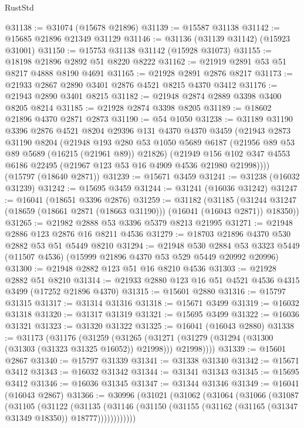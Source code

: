 \begin{lexlean}{RustStd}
\begin{coremodule}
@31138 := @31074 (@15678 @21896)
@31139 := @15587 @31138
@31142 := @15685 @21896 @21349 @31129
@31146 := @31136 (@31139 @31142) (@15923 @31001)
@31150 := @15753 @31138 @31142 (@15928 @31073)
@31155 := @18198 @21896 @2892 @51 @8220 @8222
@31162 := @21919 @2891 @53 @51 @8217 @4888 @8190 @4691
@31165 := @21928 @2891 @2876 @8217
@31173 := @21933 @2867 @2890 @3401 @2876 @4521 @8215 @4370 @3412
@31176 := @21943 @2890 @3401 @8215
@31182 := @21948 @2874 @2889 @3398 @3400 @8205 @8214
@31185 := @21928 @2874 @3398 @8205
@31189 := @18602 @21896 @4370 @2871 @2873
@31190 := @54 @1050
@31238 := @31189
    @31190
    @3396
    @2876
    @4521
    @8204
    @29396
    @131
    @4370
    @4370
    @3459
    (@21943
      @2873
      @31190
      @8204
      (@21948
        @193
        @280
        @53
        @1050
        @5689
        @6187
        (@21956 @89 @53 @89 @5689 (@16215 (@21961 @89)) @21826)
        (@21949 @156 @102 @347 @4553 @6186 @22495 (@21967 @123 @53 @16 @4909 @4536 @21980 @21998))))
    (@15797 (@18640 @2871))
@31239 := @15671 @3459
@31241 := @31238 (@16032 @31239)
@31242 := @15695 @3459
@31244 := @31241 (@16036 @31242)
@31247 := @16041 (@18651 @3396 @2876)
@31259 := @31182
    (@31185 (@31244 @31247 (@18659 (@18661 @2871 (@18663 @31190))) (@16041 (@16043 @2871)) @18350))
@31265 := @21982 @2888 @53 @3396 @5379 @8213 @21995
@31271 := @21948 @2886 @123 @2876 @16 @8211 @4536
@31279 := @18703 @21896 @4370 @530 @2882 @53 @51 @5449 @8210
@31294 := @21948
    @530
    @2884
    @53
    @3323
    @5449
    (@11507 @4536)
    (@15999 @21896 @4370 @53 @529 @5449 @20992 @20996)
@31300 := @21948 @2882 @123 @51 @16 @8210 @4536
@31303 := @21928 @2882 @51 @8210
@31314 := @21933 @2880 @123 @16 @51 @4521 @4536 @4315 @3499 (@17252 @21896 @4370)
@31315 := @15601 @2880
@31316 := @15797 @31315
@31317 := @31314 @31316
@31318 := @15671 @3499
@31319 := @16032 @31318
@31320 := @31317 @31319
@31321 := @15695 @3499
@31322 := @16036 @31321
@31323 := @31320 @31322
@31325 := @16041 (@16043 @2880)
@31338 := @31173
    (@31176
      (@31259
        (@31265 (@31271 (@31279 (@31294 (@31300 (@31303 (@31323 @31325 @16052)) @21998))) @21998))))
@31339 := @15601 @2867
@31340 := @15797 @31339
@31341 := @31338 @31340
@31342 := @15671 @3412
@31343 := @16032 @31342
@31344 := @31341 @31343
@31345 := @15695 @3412
@31346 := @16036 @31345
@31347 := @31344 @31346
@31349 := @16041 (@16043 @2867)
@31366 := @30996
    (@31021
      (@31062
        (@31064
          (@31066
            (@31087
              (@31105
                (@31122
                  (@31135
                    (@31146
                      (@31150 (@31155 (@31162 (@31165 (@31347 @31349 @18350)) @18777))))))))))))

\end{coremodule}
\end{lexlean}

